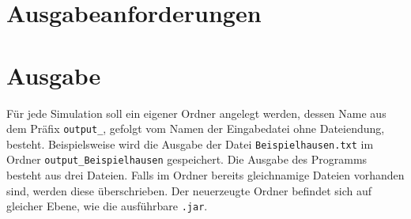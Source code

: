 \section{Ausgabeanforderungen}

\section*{Ausgabe}

Für jede Simulation soll ein eigener Ordner angelegt werden,
dessen Name aus dem Präfix \texttt{output\_},
gefolgt vom Namen der Eingabedatei ohne Dateiendung, besteht. 
Beispielsweise wird die Ausgabe der Datei \texttt{Beispielhausen.txt} im Ordner \texttt{output\_Beispielhausen} gespeichert. 
Die Ausgabe des Programms besteht aus drei Dateien. 
Falls im Ordner bereits gleichnamige Dateien vorhanden sind, werden diese überschrieben.
Der neuerzeugte Ordner befindet sich auf gleicher Ebene, wie die ausführbare \texttt{.jar}.

